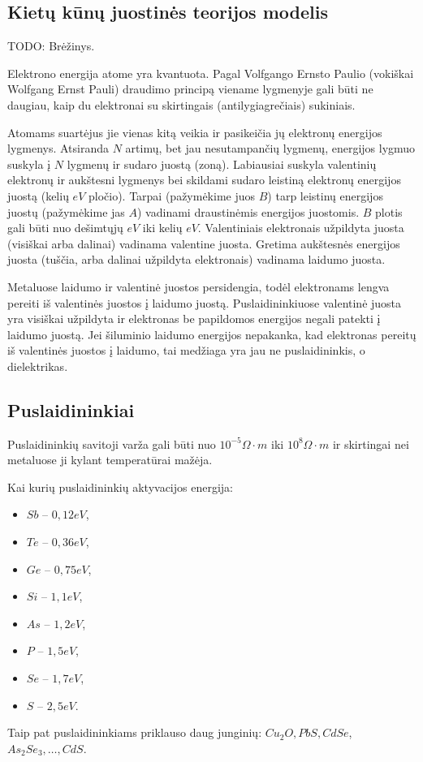 \subsection{Kietų kūnų juostinės teorijos modelis}

TODO: Brėžinys.

Elektrono energija atome yra kvantuota. Pagal Volfgango Ernsto Paulio
(vokiškai Wolfgang Ernst Pauli) draudimo principą viename lygmenyje
gali būti ne daugiau, kaip du elektronai su skirtingais
(antilygiagrečiais) sukiniais.

Atomams suartėjus jie vienas kitą veikia ir pasikeičia jų elektronų
energijos lygmenys. Atsiranda $N$ artimų, bet jau nesutampančių lygmenų,
energijos lygmuo suskyla į $N$ lygmenų ir sudaro juostą (zoną).
Labiausiai suskyla valentinių elektronų ir aukštesni lygmenys bei
skildami sudaro leistiną elektronų energijos juostą (kelių $eV$ pločio).
Tarpai (pažymėkime juos $B$) tarp leistinų energijos juostų (pažymėkime
jas $A$) vadinami draustinėmis energijos juostomis. $B$ plotis gali
būti nuo dešimtųjų $eV$ iki kelių $eV$. Valentiniais elektronais
užpildyta juosta (visiškai arba dalinai) vadinama valentine juosta.
Gretima aukštesnės energijos juosta (tuščia, arba dalinai užpildyta
elektronais) vadinama laidumo juosta.

Metaluose laidumo ir valentinė juostos persidengia, todėl elektronams
lengva pereiti iš valentinės juostos į laidumo juostą. Puslaidininkiuose
valentinė juosta yra visiškai užpildyta ir elektronas be papildomos
energijos negali patekti į laidumo juostą. Jei šiluminio laidumo
energijos nepakanka, kad elektronas pereitų iš valentinės juostos į
laidumo, tai medžiaga yra jau ne puslaidininkis, o dielektrikas.

\subsection{Puslaidininkiai}

Puslaidininkių savitoji varža gali būti nuo $10^{-5} \Omega \cdot m$
iki $10^{8} \Omega \cdot m$ ir skirtingai nei metaluose ji kylant
temperatūrai mažėja.

Kai kurių puslaidininkių aktyvacijos energija:
\begin{itemize}
  \item $Sb$ – $0,12 eV$,
  \item $Te$ – $0,36 eV$,
  \item $Ge$ – $0,75 eV$,
  \item $Si$ – $1,1 eV$,
  \item $As$ – $1,2 eV$,
  \item $P$  – $1,5 eV$,
  \item $Se$ – $1,7 eV$,
  \item $S$  – $2,5 eV$.
\end{itemize}
Taip pat puslaidininkiams priklauso daug junginių: $Cu_{2}O, PbS, CdSe$,
$As_{2}Se_{3},\ldots,CdS$.

